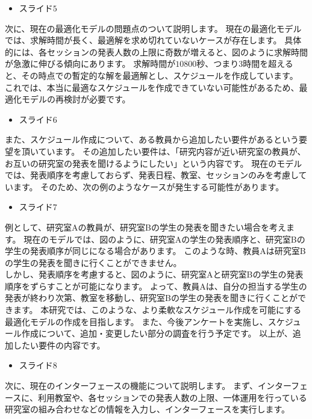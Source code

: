 \documentclass[a4j]{jarticle}
\begin{document}
\begin{itemize}
\item スライド$5$
\end{itemize}
次に、現在の最適化モデルの問題点のついて説明します。
現在の最適化モデルでは、求解時間が長く、最適解を求め切れていないケースが存在します。
具体的には、各セッションの発表人数の上限に奇数が増えると、図のように求解時間が急激に伸びる傾向にあります。
求解時間が$10800$秒、つまり$3$時間を超えると、その時点での暫定的な解を最適解とし、スケジュールを作成しています。
これでは、本当に最適なスケジュールを作成できていない可能性があるため、最適化モデルの再検討が必要です。
%

\begin{itemize}
\item スライド$6$
\end{itemize}
また、スケジュール作成について、ある教員から追加したい要件があるという要望を頂いています。
その追加したい要件は、「研究内容が近い研究室の教員が、お互いの研究室の発表を聞けるようにしたい」という内容です。
現在のモデルでは、発表順序を考慮しておらず、発表日程、教室、セッションのみを考慮しています。
そのため、次の例のようなケースが発生する可能性があります。
%
\\

\begin{itemize}
\item スライド$7$
\end{itemize}
例として、研究室Aの教員が、研究室Bの学生の発表を聞きたい場合を考えます。
現在のモデルでは、図のように、研究室Aの学生の発表順序と、研究室Bの学生の発表順序が同じになる場合があります。
このような時、教員Aは研究室Bの学生の発表を聞きに行くことができません。
\\
しかし、発表順序を考慮すると、図のように、研究室Aと研究室Bの学生の発表順序をずらすことが可能になります。
よって、教員Aは、自分の担当する学生の発表が終わり次第、教室を移動し、研究室Bの学生の発表を聞きに行くことができます。
本研究では、このような、より柔軟なスケジュール作成を可能にする最適化モデルの作成を目指します。
また、今後アンケートを実施し、スケジュール作成について、追加・変更したい部分の調査を行う予定です。
以上が、追加したい要件の内容です。
%


\begin{itemize}
\item スライド$8$
\end{itemize}
次に、現在のインターフェースの機能について説明します。
まず、インターフェースに、利用教室や、各セッションでの発表人数の上限、一体運用を行っている研究室の組み合わせなどの情報を入力し、インターフェースを実行します。
%
\end{document}
